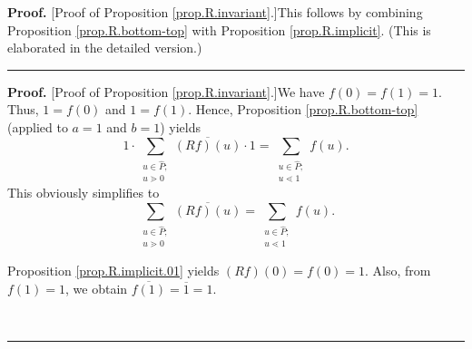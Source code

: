\documentclass[numbers=enddot,12pt,final,onecolumn,notitlepage]{scrartcl}%
\theoremstyle{definition}
\newenvironment{verlong}{}{}
\newenvironment{vershort}{}{}
\newenvironment{proof}[1][Proof]{\noindent\textbf{#1.} }{\ \rule{0.5em}{0.5em}}
\let\sumnonlimits\sum
\renewcommand{\sum}{\sumnonlimits\limits}
\begin{document}
\begin{vershort}
\begin{proof}
[Proof of Proposition \ref{prop.R.invariant}.]This follows by combining
Proposition \ref{prop.R.bottom-top} with Proposition \ref{prop.R.implicit}.
(This is elaborated in the detailed version.)
\end{proof}
\end{vershort}

\begin{verlong}
\begin{proof}
[Proof of Proposition \ref{prop.R.invariant}.]We have $f\left(  0\right)
=f\left(  1\right)  =1$. Thus, $1=f\left(  0\right)  $ and $1=f\left(
1\right)  $. Hence, Proposition \ref{prop.R.bottom-top} (applied to $a=1$ and
$b=1$) yields%
\[
1\cdot\sum_{\substack{u\in\widehat{P};\\u\gtrdot0}}\overline{\left(
Rf\right)  \left(  u\right)  }\cdot1=\sum_{\substack{u\in\widehat{P}%
;\\u\lessdot1}}f\left(  u\right)  .
\]
This obviously simplifies to
\begin{equation}
\sum_{\substack{u\in\widehat{P};\\u\gtrdot0}}\overline{\left(  Rf\right)
\left(  u\right)  }=\sum_{\substack{u\in\widehat{P};\\u\lessdot1}}f\left(
u\right)  . \label{pf.prop.R.invariant.01}%
\end{equation}


Proposition \ref{prop.R.implicit.01} yields $\left(  Rf\right)  \left(
0\right)  =f\left(  0\right)  =1$. Also, from $f\left(  1\right)  =1$, we
obtain $\overline{f\left(  1\right)  }=\overline{1}=1$.


\end{proof}
\end{verlong}
\end{document}
